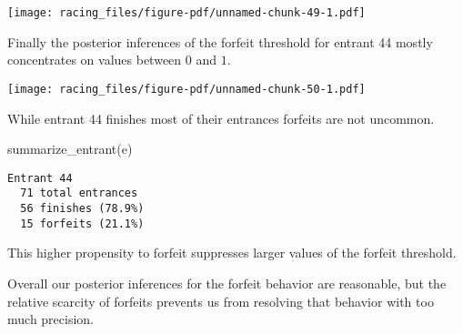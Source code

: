 \documentclass[
  letterpaper,
  DIV=11,
  numbers=noendperiod]{scrartcl}
\newenvironment{Shaded}{\begin{snugshade}}{\end{snugshade}}
\newcommand{\AttributeTok}[1]{\textcolor[rgb]{0.40,0.45,0.13}{#1}}
\newcommand{\DecValTok}[1]{\textcolor[rgb]{0.68,0.00,0.00}{#1}}
\newcommand{\FunctionTok}[1]{\textcolor[rgb]{0.28,0.35,0.67}{#1}}
\newcommand{\NormalTok}[1]{\textcolor[rgb]{0.00,0.23,0.31}{#1}}
\newcommand{\OtherTok}[1]{\textcolor[rgb]{0.00,0.23,0.31}{#1}}
\newcommand{\SpecialCharTok}[1]{\textcolor[rgb]{0.37,0.37,0.37}{#1}}
\newcommand{\StringTok}[1]{\textcolor[rgb]{0.13,0.47,0.30}{#1}}
\begin{document}
\texttt{[image: racing\_files/figure-pdf/unnamed-chunk-49-1.pdf]}

Finally the posterior inferences of the forfeit threshold for entrant 44
mostly concentrates on values between \(0\) and \(1\).

\begin{Shaded}
\end{Shaded}

\texttt{[image: racing\_files/figure-pdf/unnamed-chunk-50-1.pdf]}

While entrant 44 finishes most of their entrances forfeits are not
uncommon.

\begin{Shaded}
\begin{Highlighting}[]
\FunctionTok{summarize\_entrant}\NormalTok{(e)}
\end{Highlighting}
\end{Shaded}

\begin{verbatim}
Entrant 44
  71 total entrances
  56 finishes (78.9%)
  15 forfeits (21.1%)
\end{verbatim}

This higher propensity to forfeit suppresses larger values of the
forfeit threshold.

Overall our posterior inferences for the forfeit behavior are
reasonable, but the relative scarcity of forfeits prevents us from
resolving that behavior with too much precision.
\end{document}
